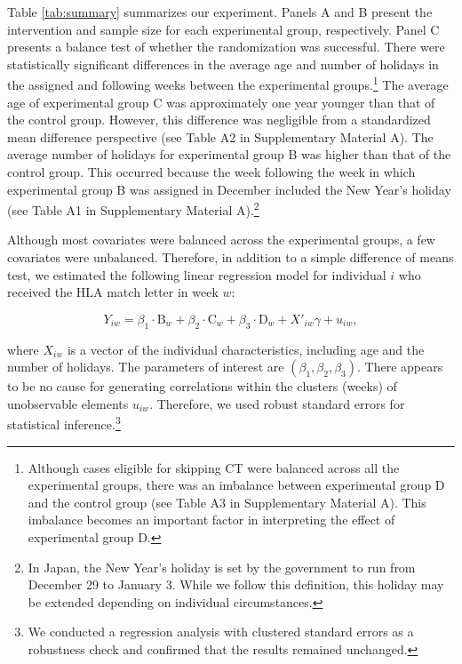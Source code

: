 \documentclass[12pt, a4paper]{article}
\begin{document}
Table \ref{tab:summary} summarizes our experiment. Panels A and B present the intervention and sample size for each experimental group, respectively. Panel C presents a balance test of whether the randomization was successful. There were statistically significant differences in the average age and number of holidays in the assigned and following weeks between the experimental groups.\footnote{Although cases eligible for skipping CT were balanced across all the experimental groups, there was an imbalance between experimental group D and the control group (see Table A3 in Supplementary Material A). This imbalance becomes an important factor in interpreting the effect of experimental group D.} The average age of experimental group C was approximately one year younger than that of the control group. However, this difference was negligible from a standardized mean difference perspective (see Table A2 in Supplementary Material A). The average number of holidays for experimental group B was higher than that of the control group. This occurred because the week following the week in which experimental group B was assigned in December included the New Year's holiday (see Table A1 in Supplementary Material A).\footnote{In Japan, the New Year's holiday is set by the government to run from December 29 to January 3. While we follow this definition, this holiday may be extended depending on individual circumstances.}

Although most covariates were balanced across the experimental groups, a few covariates were unbalanced. Therefore, in addition to a simple difference of means test, we estimated the following linear regression model for individual \(i\) who received the HLA match letter in week \(w\):

\begin{equation}
  Y_{iw} =
  \beta_1 \cdot \text{B}_{w} + \beta_2 \cdot \text{C}_{w} + \beta_3 \cdot \text{D}_{w}
  + X'_{iw} \gamma + u_{iw}, \label{eq:reg}
\end{equation}

\noindent
where \(X_{iw}\) is a vector of the individual characteristics, including age and the number of holidays. The parameters of interest are \((\beta_1, \beta_2, \beta_3)\). There appears to be no cause for generating correlations within the clusters (weeks) of unobservable elements \(u_{iw}\). Therefore, we used robust standard errors for statistical inference.\footnote{We conducted a regression analysis with clustered standard errors as a robustness check and confirmed that the results remained unchanged.}
\end{document}
